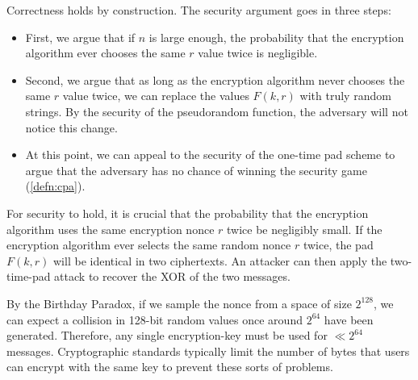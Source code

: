 Correctness holds by construction.
The security argument goes in three steps:
\begin{itemize}
  \item First, we argue that if $n$ is large enough, the probability 
        that the encryption algorithm ever chooses the same $r$ value twice
        is negligible.
  \item Second, we argue that as long as the encryption algorithm
        never chooses the same $r$ value twice, 
        we can replace the values $F(k, r)$ with truly random strings.
        By the security of the pseudorandom function, the adversary will
        not notice this change.
  \item At this point, we can appeal to the security of the one-time pad scheme
        to argue that the adversary has no chance of winning the security 
        game (\cref{defn:cpa}).
\end{itemize}

For security to hold, it is crucial that the probability 
that the encryption algorithm uses the same encryption nonce $r$ twice
be negligibly small.
If the encryption algorithm ever selects the
same random nonce $r$ twice, the pad $F(k, r)$ will be identical in 
two ciphertexts.
An attacker can then apply the two-time-pad attack to recover the XOR of the two messages.

By the Birthday Paradox, if we sample the nonce from a space of size $2^{128}$, we can expect a collision in 128-bit random values once around $2^{64}$ have been generated. Therefore, any single encryption-key must be used for $\ll 2^{64}$ messages.
Cryptographic standards typically limit the number of bytes that users can
encrypt with the same key to prevent these sorts of problems.



